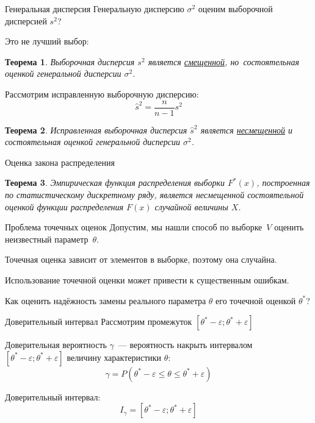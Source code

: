 \documentclass[unicode,11pt,notheorems,xcolor=table]{beamer}
\newtheorem{theorem}{Теорема}
\begin{document}
\begin{frame}{Генеральная дисперсия}{}
    Генеральную дисперсию $\sigma^2$ оценим выборочной дисперсией $s^2$?
    
    \medskip
    \pause
    Это не лучший выбор:
    \begin{theorem}
        Выборочная дисперсия $s^2$ является \underline{смещенной}, но~состоятельная оценкой  генеральной дисперсии $\sigma^2$.
    \end{theorem}
    \pause
    Рассмотрим \alert{исправленную выборочную дисперсию}:
    $$
    \hat{s}^2 = \frac{n}{n-1}s^2
    $$
    \begin{theorem}
        Исправленная выборочная дисперсия $\hat{s}^2$ является \underline{несмещенной} и состоятельная оценкой  генеральной дисперсии $\sigma^2$.
    \end{theorem}
\end{frame}

\begin{frame}{Оценка закона распределения}{}
    \begin{theorem}
        Эмпирическая функция распределения выборки $F^*(x)$, построенная по статистическому дискретному ряду, является несмещенной состоятельной оценкой функции распределения $F(x)$ случайной величины $X$.
    \end{theorem}
\end{frame}
\begin{frame}{Проблема точечных оценок}{}
    Допустим, мы нашли способ по выборке~$V$ оценить неизвестный параметр~$\theta$.

    
    Точечная оценка зависит от элементов в выборке, поэтому она случайна.
    
    Использование точечной оценки может привести к существенным ошибкам.

    Как оценить надёжность замены реального параметра $\theta$ его точечной оценкой $\theta^*$? 

\end{frame}



\begin{frame}{Доверительный интервал}{}
    Рассмотрим промежуток $[\theta^*-\varepsilon; \theta^*+\varepsilon]$
    
    \alert{Доверительная вероятность $\gamma$}~--- вероятность накрыть интервалом $[\theta^*-\varepsilon; \theta^*+\varepsilon]$ величину характеристики $\theta$:
    $$
        \gamma = P(\theta^*-\varepsilon \leqslant \theta \leqslant \theta^*+\varepsilon)
    $$

    \alert{Доверительный интервал:}
    $$
        I_\gamma = [\theta^*-\varepsilon; \theta^*+\varepsilon]
    $$
\end{frame}
\end{document}
